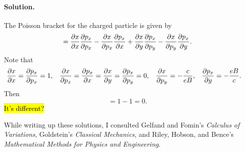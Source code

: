 \documentclass[11pt]{article}
\newcommand{\beq}{\begin{equation*}}
\newcommand{\eeq}{\end{equation*}}
\newenvironment{solution}
{
    \paragraph{Solution.}
    \ignorespaces
}
{
    \bigskip
}
\begin{document}
\begin{solution}
	The Poisson bracket for the charged particle is given by
	\beq
		[x, \px] = \pdv{x}{x} \pdv{\px}{\px} - \pdv{x}{\px} \pdv{\px}{x} + \pdv{x}{y} \pdv{\px}{\py} - \pdv{x}{\py} \pdv{\px}{y}.
	\eeq
	Note that
	\begin{align*}
		\pdv{x}{x} &= \pdv{p_x}{p_x} = 1, &
		\pdv{x}{p_x} &= \pdv{p_x}{x} = \pdv{x}{y} = \pdv{p_x}{p_y} = 0, &
		\pdv{x}{p_y} &= -\frac{c}{e B}, &
		\pdv{p_x}{y} &= -\frac{e B}{c}.
	\end{align*}
	Then
	\beq
		[x, \px] = 1 - 1 = 0.
	\eeq
	\hl{It's different?}
\end{solution}


\vfill
While writing up these solutions, I consulted Gelfand and Fomin's \emph{Calculus of Variations}, Goldstein's \emph{Classical Mechanics}, and Riley, Hobson, and Bence's \emph{Mathematical Methods for Physics and Engineering}.
\end{document}

